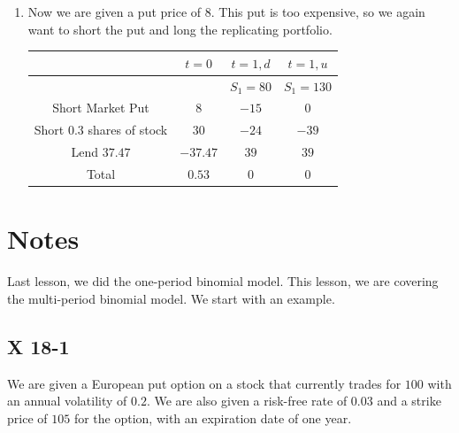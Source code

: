 \documentclass[12pt, letterpaper]{article}
\begin{document}
\begin{enumerate}
    \item Now we are given a put price of \(8\). This put is too expensive, so we again want to short the put and long the replicating portfolio.
    
    \begin{tabular}{|c|c|c|c|}
        \hline
         & \(t = 0\) & \(t = 1, d\) & \(t = 1, u\) \\
         \hline
         & & \(S_1 = 80\) & \(S_1 = 130\) \\
         \hline
         Short Market Put & \(8\) & \(-15\) & \(0\) \\
         \hline
         Short \(0.3\) shares of stock & \(30\) & \(-24\) & \(-39\) \\
         \hline
         Lend \(37.47\) & \(-37.47\) & \(39\) & \(39\) \\
         \hline
         Total & \(0.53\) & \(0\) & \(0\) \\
         \hline
    \end{tabular}
    \end{enumerate}


    \section{Notes}

    Last lesson, we did the one-period binomial model. This lesson, we are covering the multi-period binomial model. We start with an example.

    \subsection{X 18-1}

    We are given a European put option on a stock that currently trades for \(100\) with an annual volatility of \(0.2\). We are also given a risk-free rate of \(0.03\) and a strike price of \(105\) for the option, with an expiration date of one year. 
\end{document}
